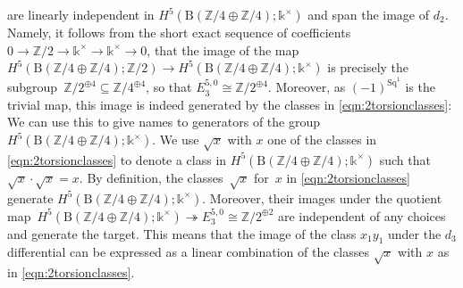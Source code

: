 \documentclass[pdftex]{sigma}
\numberwithin{equation}{section}
\begin{document}
 are linearly independent in $H^5(\mathrm{B}(\mathbb{Z}/4\oplus\mathbb{Z}/4);\mathds{k}^{\times})$ and span the image of $d_2$. Namely, it follows from the short exact sequence of coefficients $0\rightarrow\mathbb{Z}/2\rightarrow\mathds{k}^{\times}\rightarrow\mathds{k}^{\times}\rightarrow 0$, that the image of the map $H^5(\mathrm{B}(\mathbb{Z}/4\oplus\mathbb{Z}/4);\mathbb{Z}/2)\rightarrow H^5(\mathrm{B}(\mathbb{Z}/4\oplus\mathbb{Z}/4);\mathds{k}^{\times})$ is precisely the subgroup~${\mathbb{Z}/2^{\oplus 4}\subseteq \mathbb{Z}/4^{\oplus 4}}$, so that $E_3^{5,0}\cong \mathbb{Z}/2^{\oplus 4}$. Moreover, as $(-1)^{\mathrm{Sq}^1}$ is the trivial map, this image is indeed generated by the classes in \eqref{eqn:2torsionclasses}: We can use this to give names to generators of the group ${H^5(\mathrm{B}(\mathbb{Z}/4\oplus\mathbb{Z}/4);\mathds{k}^{\times})}$. We use $\sqrt{x}$ with $x$ one of the classes in \eqref{eqn:2torsionclasses} to denote a class in $H^5(\mathrm{B}(\mathbb{Z}/4\oplus\mathbb{Z}/4);\mathds{k}^{\times})$ such that $\sqrt{x}\cdot \sqrt{x} = x$. By definition, the classes~$\sqrt{x}$ for~$x$ in \eqref{eqn:2torsionclasses} generate $H^5(\mathrm{B}(\mathbb{Z}/4\oplus\mathbb{Z}/4);\mathds{k}^{\times})$. Moreover, their images under the quotient map~${H^5(\mathrm{B}(\mathbb{Z}/4\oplus\mathbb{Z}/4);\mathds{k}^{\times})\twoheadrightarrow E_3^{5,0}\cong\mathbb{Z}/2^{\oplus 2}}$ are independent of any choices and generate the target. This means that the image of the class $x_1y_1$ under the $d_3$ differential  can be expressed as a linear combination of the classes $\sqrt{x}$ with $x$ as in \eqref{eqn:2torsionclasses}.
\end{document}
